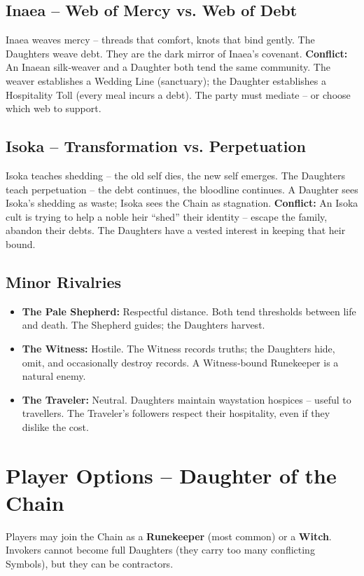 \documentclass[10pt,twoside]{book}
\begin{document}
\section{Inaea – Web of Mercy vs. Web of Debt}
Inaea weaves mercy – threads that comfort, knots that bind gently. The Daughters weave debt. They are the dark mirror of Inaea's covenant. \textbf{Conflict:} An Inaean silk‑weaver and a Daughter both tend the same community. The weaver establishes a Wedding Line (sanctuary); the Daughter establishes a Hospitality Toll (every meal incurs a debt). The party must mediate – or choose which web to support.

\section{Isoka – Transformation vs. Perpetuation}
Isoka teaches shedding – the old self dies, the new self emerges. The Daughters teach perpetuation – the debt continues, the bloodline continues. A Daughter sees Isoka's shedding as waste; Isoka sees the Chain as stagnation. \textbf{Conflict:} An Isoka cult is trying to help a noble heir “shed” their identity – escape the family, abandon their debts. The Daughters have a vested interest in keeping that heir bound.

\section{Minor Rivalries}
\begin{itemize}
\item \textbf{The Pale Shepherd:} Respectful distance. Both tend thresholds between life and death. The Shepherd guides; the Daughters harvest.
\item \textbf{The Witness:} Hostile. The Witness records truths; the Daughters hide, omit, and occasionally destroy records. A Witness‑bound Runekeeper is a natural enemy.
\item \textbf{The Traveler:} Neutral. Daughters maintain waystation hospices – useful to travellers. The Traveler's followers respect their hospitality, even if they dislike the cost.
\end{itemize}

\chapter{Player Options – Daughter of the Chain}

Players may join the Chain as a \textbf{Runekeeper} (most common) or a \textbf{Witch}. Invokers cannot become full Daughters (they carry too many conflicting Symbols), but they can be contractors.
\end{document}
